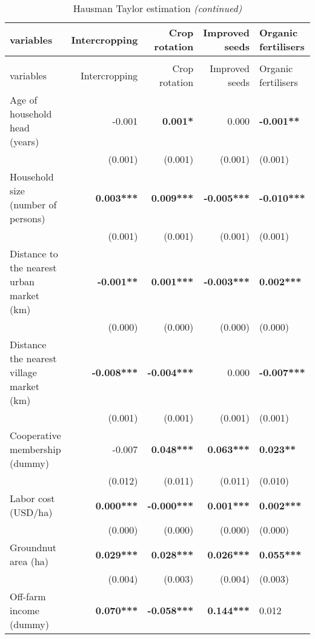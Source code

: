 \documentclass[
]{article}
\begin{document}
\newpage

\begingroup\fontsize{7}{9}\selectfont

\begin{landscape}
\begin{longtable}[t]{lrrrl}
\caption{\label{tab:unnamed-chunk-8}Hausman Taylor estimation}\\
\toprule
variables & Intercropping & Crop rotation & Improved seeds & Organic fertilisers\\
\midrule
\endfirsthead
\caption[]{\label{tab:unnamed-chunk-8}Hausman Taylor estimation \textit{(continued)}}\\
\toprule
variables & Intercropping & Crop rotation & Improved seeds & Organic fertilisers\\
\midrule
\endhead

\endfoot
\bottomrule
\endlastfoot
Age of household head (years) & -0.001 & \textbf{0.001*} & 0.000 & \textbf{-0.001**}\\
 & (0.001) & (0.001) & (0.001) & \vphantom{2} (0.001)\\
Household size (number of persons) & \textbf{0.003***} & \textbf{0.009***} & \textbf{-0.005***} & \textbf{-0.010***}\\
 & (0.001) & (0.001) & (0.001) & \vphantom{1} (0.001)\\
Distance to the nearest urban market (km) & \textbf{-0.001**} & \textbf{0.001***} & \textbf{-0.003***} & \textbf{0.002***}\\
\addlinespace
 & (0.000) & (0.000) & (0.000) & \vphantom{1} (0.000)\\
Distance the nearest village market (km) & \textbf{-0.008***} & \textbf{-0.004***} & 0.000 & \textbf{-0.007***}\\
 & (0.001) & (0.001) & (0.001) & (0.001)\\
Cooperative membership (dummy) & -0.007 & \textbf{0.048***} & \textbf{0.063***} & \textbf{0.023**}\\
 & (0.012) & (0.011) & (0.011) & (0.010)\\
\addlinespace
Labor cost (USD/ha) & \textbf{0.000***} & \textbf{-0.000***} & \textbf{0.001***} & \textbf{0.002***}\\
 & (0.000) & (0.000) & (0.000) & (0.000)\\
Groundnut area (ha) & \textbf{0.029***} & \textbf{0.028***} & \textbf{0.026***} & \textbf{0.055***}\\
 & (0.004) & (0.003) & (0.004) & (0.003)\\
Off-farm income (dummy) & \textbf{0.070***} & \textbf{-0.058***} & \textbf{0.144***} & 0.012\\

\end{longtable}
\end{landscape}
\end{document}
